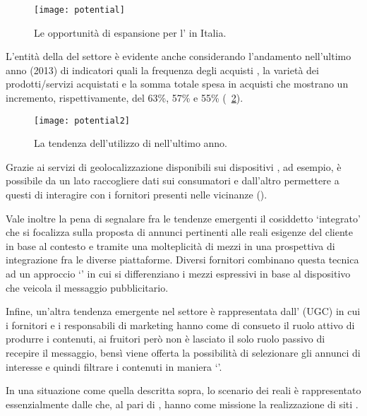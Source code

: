 \begin{figure}[H]
  \centering
  \texttt{[image: potential]}
  \caption{Le opportunità di espansione per l' in Italia.}
  \label{fig:potential}
\end{figure}

L'entità della  del settore è evidente anche considerando l'andamento nell'ultimo anno (2013) di indicatori quali la frequenza degli acquisti , la varietà dei prodotti/servizi acquistati e la somma totale spesa in acquisti  che mostrano un incremento, rispettivamente, del 63\%, 57\% e 55\% (\figurename~\ref{fig:potential2}).

\begin{figure}[H]
  \centering
  \texttt{[image: potential2]}
  \caption{La tendenza dell'utilizzo di  nell'ultimo anno.}
  \label{fig:potential2}
\end{figure}

Grazie ai servizi di geolocalizzazione disponibili sui dispositivi , ad esempio, è possibile da un lato raccogliere dati sui consumatori e dall'altro permettere a questi di interagire con i fornitori presenti nelle vicinanze ().

Vale inoltre la pena di segnalare fra le tendenze emergenti il cosiddetto `\mktg integrato' che si focalizza sulla proposta di annunci pertinenti alle reali esigenze del cliente in base al contesto e tramite una molteplicità di mezzi in una prospettiva di integrazione fra le diverse piattaforme. Diversi fornitori combinano questa tecnica ad un approccio `' in cui si differenziano i mezzi espressivi in base al dispositivo che veicola il messaggio pubblicitario.

Infine, un'altra tendenza emergente nel settore è rappresentata dall' (UGC) in cui i fornitori e i responsabili di marketing hanno come di consueto il ruolo attivo di produrre i contenuti,  ai fruitori però non è lasciato il solo ruolo passivo di recepire il messaggio, bensì viene offerta la possibilità di selezionare gli annunci di interesse e quindi filtrare i contenuti in maniera `'.

In una situazione come quella descritta sopra, lo scenario dei  reali è rappresentato essenzialmente dalle  che, al pari di \customer, hanno come missione la realizzazione di siti .

